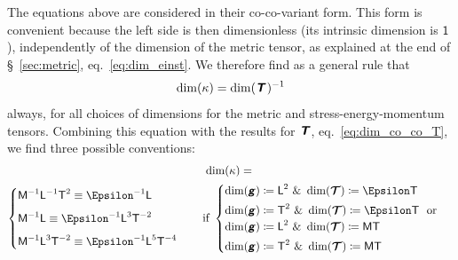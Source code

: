 \documentclass[\ifafour a4paper,12pt,\else a5paper,10pt,\fi%
onecolumn,oneside,article,%
british%
]{memoir}
\makeatletter
\theoremstyle{remark}
\theoremstyle{innote}
\newcommand*{\mathte}[1]{\textbf{\textit{\textsf{#1}}}}
\newcommand*{\amp}{\&}
\newcommand*{\defd}{\coloneqq}
\renewcommand*{\|}[1][]{\nonscript\,#1\vert\nonscript\;\mathopen{}}
\newcommand*{\sect}{\S}%
\newcommand*{\eqn}{eq.}%
\newcommand*{\q}{}%
\DeclareRobustCommand*{\q}{%
  \mathord{\mathpalette\bigcdot@{}}%
}
\newcommand*{\bigcdot@scalefactor}{0.7}
\newcommand*{\bigcdot@widthfactor}{1.5}
\newcommand*{\bigcdot@}[2]{%
  \sbox0{$#1\vcenter{}$}%
  \sbox2{$#1\cdot\m@th$}%
  \hbox to \bigcdot@widthfactor\wd2{%
    \hfil
    \raise\ht0\hbox{%
      \scalebox{\bigcdot@scalefactor}{%
        \lower\ht0\hbox{$#1\bullet\m@th$}%
      }%
    }%
    \hfil
  }%
}
\newcommand*{\Un}{\textsf{1}}
\newcommand*{\Le}{\textsf{L}}
\newcommand*{\Ti}{\textsf{T}}
\newcommand*{\Ma}{\textsf{M}}
\newcommand*{\En}{\Epsilon}%
\newcommand*{\yg}{\mathte{g}}
\newcommand*{\yT}{\bm{\mathcal{T}}}
\newcommand*{\yTe}{\mathte{T}}
\newcommand*{\yG}{\mathte{G}}
\renewcommand*{\i}{\indices}
\newcommand*{\yk}{\kappa}
\makeatother
\begin{document}
The equations above are considered in their co-co-variant form. This form
is convenient because the left side is then dimensionless (its intrinsic
dimension is $\Un$), independently of the dimension of the metric tensor,
as explained at the end of \sect~\ref{sec:metric},
\eqn~\eqref{eq:dim_einst}. We therefore find as a general rule that
\begin{equation}
  \label{eq:dim_k_general}
  \dim(\yk) = \dim(\yTe\i{_{\q\q}})^{-1} 
\end{equation}
always, for all choices of dimensions for the metric and
stress-energy-momentum tensors. Combining this equation with the results
for $\yTe$, \eqn~\eqref{eq:dim_co_co_T}, we find three possible
conventions:
\begin{multline}
\label{eq:dim_k_choices}
\dim(\yk) ={}\\
  \begin{cases}
\Ma^{-1}\Le^{-1}\Ti^{2} \equiv \En^{-1}\Le \\[2\jot]
\Ma^{-1}\Le \equiv \En^{-1}\Le^{3}\Ti^{-2} \\[2\jot]
\Ma^{-1}\Le^{3}\Ti^{-2} \equiv \En^{-1}\Le^{5}\Ti^{-4}
  \end{cases}
  \quad\text{if }
  \begin{cases}
\dim(\yg)\defd \Le^2 \text{ \amp\ }\dim(\yT)\defd \En\Ti \\[\jot]
    \dim(\yg)\defd \Ti^2 \text{ \amp\ }\dim(\yT)\defd \En\Ti 
    \ \text{ or }\\
\dim(\yg)\defd \Le^2 \text{ \amp\ }\dim(\yT)\defd \Ma\Ti \\[\jot]
\dim(\yg)\defd \Ti^2 \text{ \amp\ }\dim(\yT)\defd \Ma\Ti
  \end{cases}
\end{multline}
\end{document}
